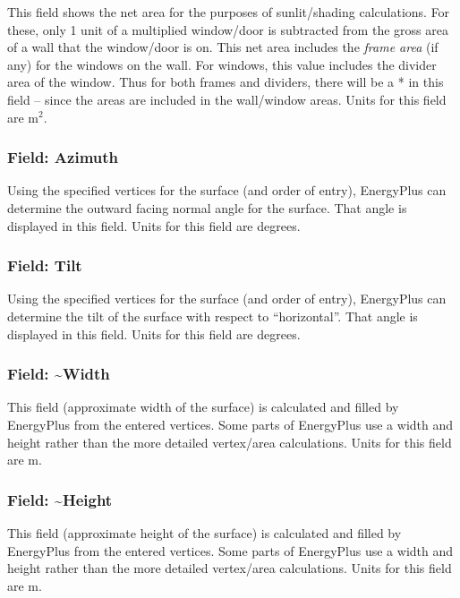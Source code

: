 This field shows the net area for the purposes of sunlit/shading calculations. For these, only 1 unit of a multiplied window/door is subtracted from the gross area of a wall that the window/door is on. This net area includes the \emph{frame area} (if any) for the windows on the wall. For windows, this value includes the divider area of the window. Thus for both frames and dividers, there will be a * in this field -- since the areas are included in the wall/window areas. Units for this field are m\(^{2}\).

\subsubsection{Field: Azimuth}\label{field-azimuth}

Using the specified vertices for the surface (and order of entry), EnergyPlus can determine the outward facing normal angle for the surface. That angle is displayed in this field. Units for this field are degrees.

\subsubsection{Field: Tilt}\label{field-tilt}

Using the specified vertices for the surface (and order of entry), EnergyPlus can determine the tilt of the surface with respect to ``horizontal''. That angle is displayed in this field. Units for this field are degrees.

\subsubsection{Field: \textasciitilde{}Width}\label{field-width}

This field (approximate width of the surface) is calculated and filled by EnergyPlus from the entered vertices. Some parts of EnergyPlus use a width and height rather than the more detailed vertex/area calculations. Units for this field are m.

\subsubsection{Field: \textasciitilde{}Height}\label{field-height}

This field (approximate height of the surface) is calculated and filled by EnergyPlus from the entered vertices. Some parts of EnergyPlus use a width and height rather than the more detailed vertex/area calculations. Units for this field are m.

